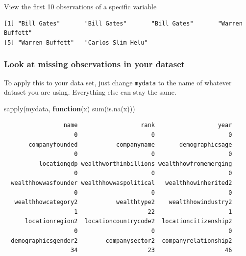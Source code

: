 \documentclass[
]{book}
\newenvironment{Shaded}{\begin{snugshade}}{\end{snugshade}}
\newcommand{\ControlFlowTok}[1]{\textcolor[rgb]{0.13,0.29,0.53}{\textbf{#1}}}
\newcommand{\FunctionTok}[1]{\textcolor[rgb]{0.00,0.00,0.00}{#1}}
\newcommand{\NormalTok}[1]{#1}
\newcommand{\SpecialCharTok}[1]{\textcolor[rgb]{0.00,0.00,0.00}{#1}}
\begin{document}
View the first 10 observations of a specific variable

\begin{Shaded}
\end{Shaded}

\begin{verbatim}
[1] "Bill Gates"       "Bill Gates"       "Bill Gates"       "Warren Buffett"  
[5] "Warren Buffett"   "Carlos Slim Helu"
\end{verbatim}

\hypertarget{missing}{%
\subsubsection*{Look at missing observations in your dataset}\label{missing}}

To apply this to your data set, just change \texttt{mydata} to the name of whatever dataset you are using. Everything else can stay the same.

\begin{Shaded}
\begin{Highlighting}[]
\FunctionTok{sapply}\NormalTok{(mydata, }\ControlFlowTok{function}\NormalTok{(x) }\FunctionTok{sum}\NormalTok{(}\FunctionTok{is.na}\NormalTok{(x)))}
\end{Highlighting}
\end{Shaded}

\begin{verbatim}
                 name                  rank                  year 
                    0                     0                     0 
       companyfounded           companyname       demographicsage 
                    0                     0                     0 
          locationgdp wealthworthinbillions wealthhowfromemerging 
                    0                     0                     0 
  wealthhowwasfounder wealthhowwaspolitical   wealthhowinherited2 
                    0                     0                     0 
   wealthhowcategory2           wealthtype2    wealthhowindustry2 
                    1                    22                     1 
      locationregion2  locationcountrycode2  locationcitizenship2 
                    0                     0                     0 
  demographicsgender2        companysector2  companyrelationship2 
                   34                    23                    46 
\end{verbatim}
\end{document}
